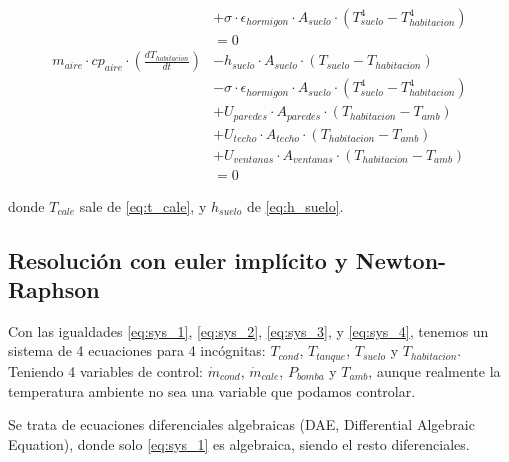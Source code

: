 \begin{align}
	                                                                         & + \sigma \cdot \epsilon_{hormigon} \cdot A_{suelo} \cdot (T_{suelo}^4 - T_{habitacion}^4)  \nonumber \\
	                                                                         & = 0  \label{eq:sys_3}                                                                                \\
	m_{aire} \cdot cp_{aire} \cdot \left( \frac{dT_{habitacion}}{dt} \right) & - h_{suelo} \cdot A_{suelo} \cdot (T_{suelo} - T_{habitacion})  \nonumber                            \\
	                                                                         & - \sigma \cdot \epsilon_{hormigon} \cdot A_{suelo} \cdot (T_{suelo}^4 - T_{habitacion}^4)  \nonumber \\
	                                                                         & + U_{paredes} \cdot A_{paredes} \cdot (T_{habitacion} - T_{amb}) \nonumber                           \\
	                                                                         & + U_{techo} \cdot A_{techo} \cdot (T_{habitacion} - T_{amb}) \nonumber                               \\
	                                                                         & + U_{ventanas} \cdot A_{ventanas} \cdot (T_{habitacion} - T_{amb}) \nonumber                         \\
	                                                                         & = 0  \label{eq:sys_4}
\end{align}

donde $T_{cale}$ sale de \eqref{eq:t_cale}, y $h_{suelo}$ de \eqref{eq:h_suelo}.


\subsection{Resolución con euler implícito y Newton-Raphson}

Con las igualdades \eqref{eq:sys_1}, \eqref{eq:sys_2},
\eqref{eq:sys_3}, y \eqref{eq:sys_4}, tenemos un sistema de 4
ecuaciones para 4 incógnitas: $T_{cond}$, $T_{tanque}$, $T_{suelo}$
y $T_{habitacion}$. Teniendo 4 variables de control: $\dot{m}_{cond}$,
$\dot{m}_{cale}$, $P_{bomba}$ y $T_{amb}$, aunque realmente la temperatura
ambiente no sea una variable que podamos controlar.

Se trata de ecuaciones diferenciales algebraicas (DAE,
Differential Algebraic Equation), donde solo \eqref{eq:sys_1} es algebraica,
siendo el resto diferenciales.

